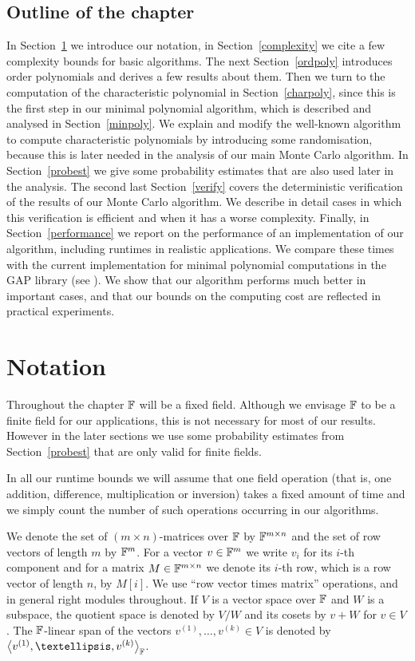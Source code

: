 \subsection{Outline of the chapter}
In Section~\ref{notation} we introduce our notation, in
Section~\ref{complexity} we cite a few complexity bounds for basic
algorithms. The next Section~\ref{ordpoly} introduces order polynomials
and derives a few results about them. Then we turn to the computation
of the characteristic polynomial in Section~\ref{charpoly}, since this
is the first step in our minimal polynomial algorithm, which is described
and analysed in Section~\ref{minpoly}. We explain and modify the 
well-known algorithm to compute characteristic polynomials by introducing
some randomisation, because this is later needed in the analysis of our
main Monte Carlo algorithm. In Section~\ref{probest} we give some
probability estimates that are also used later in the analysis.
The second last Section~\ref{verify}
covers the deterministic verification of the results of our
Monte Carlo algorithm. We describe in detail cases in which this
verification is efficient and when it has a worse complexity.
Finally, in Section~\ref{performance} we report on the performance
of an implementation of our algorithm, including runtimes in 
realistic applications.  We compare these
times with the current implementation for minimal polynomial computations
in the {\sf GAP} library (see \cite{GAP4}). We show that our algorithm performs
much better in important cases, and that our bounds on the computing
cost are reflected in practical experiments.


\section{Notation}
\label{notation}

Throughout the chapter $\mathbb{F}$ will be a fixed field. Although we envisage
$\mathbb{F}$ to be a finite field for our applications, this is not necessary
for most of our results. However in the later sections we use some probability 
estimates from Section~\ref{probest} that are only valid for 
finite fields.

In all our runtime bounds we will assume that one 
field operation (that is, one addition, difference, multiplication or
inversion) takes a fixed amount of time and we simply count
the number of such operations occurring in our algorithms.

We denote the set of $(m \times n)$-matrices over $\mathbb{F}$ by $\mathbb{F}^{m \times n}$
and the set of row vectors of length $m$ by $\mathbb{F}^m$. For a vector
$v \in \mathbb{F}^m$ we write $v_i$ for its $i$-th component and for a matrix 
$M \in \mathbb{F}^{m \times n}$ we denote its $i$-th row, which is
a row vector of length $n$, by $M[i]$. We use ``row vector
times matrix'' operations, and in general right modules throughout.
If $V$ is a vector space over $\mathbb{F}$ and $W$ is a subspace, the
quotient space is denoted by $V/W$ and its cosets by
$v+W$ for $v \in V$. The $\mathbb{F}$-linear span of the vectors
$v^{(1)}, \ldots, v^{(k)} \in V$ is denoted by 
$\left< v^{(1)}, \ldots, v^{(k)}\right>_\F$.

